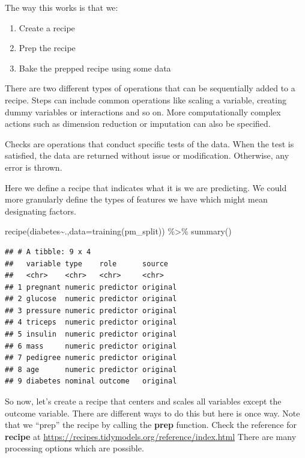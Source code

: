 \documentclass[
]{article}
\newenvironment{Shaded}{\begin{snugshade}}{\end{snugshade}}
\newcommand{\AttributeTok}[1]{\textcolor[rgb]{0.77,0.63,0.00}{#1}}
\newcommand{\FunctionTok}[1]{\textcolor[rgb]{0.00,0.00,0.00}{#1}}
\newcommand{\NormalTok}[1]{#1}
\newcommand{\SpecialCharTok}[1]{\textcolor[rgb]{0.00,0.00,0.00}{#1}}
\providecommand{\tightlist}{%
  \setlength{\itemsep}{0pt}\setlength{\parskip}{0pt}}
\begin{document}
The way this works is that we:

\begin{enumerate}
\def\labelenumi{\arabic{enumi})}
\tightlist
\item
  Create a recipe
\item
  Prep the recipe
\item
  Bake the prepped recipe using some data
\end{enumerate}

There are two different types of operations that can be sequentially
added to a recipe. Steps can include common operations like scaling a
variable, creating dummy variables or interactions and so on. More
computationally complex actions such as dimension reduction or
imputation can also be specified.

Checks are operations that conduct specific tests of the data. When the
test is satisfied, the data are returned without issue or modification.
Otherwise, any error is thrown.

Here we define a recipe that indicates what it is we are predicting. We
could more granularly define the types of features we have which might
mean designating factors.

\begin{Shaded}
\begin{Highlighting}[]
\FunctionTok{recipe}\NormalTok{(diabetes}\SpecialCharTok{\textasciitilde{}}\NormalTok{.,}\AttributeTok{data=}\FunctionTok{training}\NormalTok{(pm\_split)) }\SpecialCharTok{\%\textgreater{}\%} \FunctionTok{summary}\NormalTok{()}
\end{Highlighting}
\end{Shaded}

\begin{verbatim}
## # A tibble: 9 x 4
##   variable type    role      source  
##   <chr>    <chr>   <chr>     <chr>   
## 1 pregnant numeric predictor original
## 2 glucose  numeric predictor original
## 3 pressure numeric predictor original
## 4 triceps  numeric predictor original
## 5 insulin  numeric predictor original
## 6 mass     numeric predictor original
## 7 pedigree numeric predictor original
## 8 age      numeric predictor original
## 9 diabetes nominal outcome   original
\end{verbatim}

So now, let's create a recipe that centers and scales all variables
except the outcome variable. There are different ways to do this but
here is once way. Note that we ``prep'' the recipe by calling the
\textbf{prep} function. Check the reference for \textbf{recipe} at
\url{https://recipes.tidymodels.org/reference/index.html} There are many
processing options which are possible.
\end{document}
